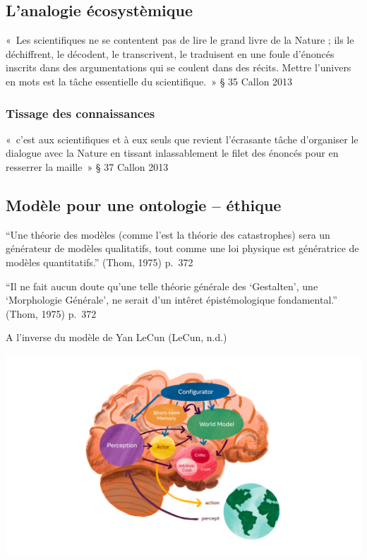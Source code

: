 \documentclass[
  letterpaper,
  DIV=11,
  numbers=noendperiod]{scrreprt}
\begin{document}
\hypertarget{sec-analogieEcosysteme}{%
\subsection{L'analogie écosystèmique}\label{sec-analogieEcosysteme}}

«~Les scientifiques ne se contentent pas de lire le grand livre de la
Nature ; ils le déchiffrent, le décodent, le transcrivent, le traduisent
en une foule d'énoncés inscrits dans des argumentations qui se coulent
dans des récits. Mettre l'univers en mots est la tâche essentielle du
scientifique.~» § 35 Callon 2013

\hypertarget{tissage-des-connaissances}{%
\subsubsection{Tissage des
connaissances}\label{tissage-des-connaissances}}

«~c'est aux scientifiques et à eux seuls que revient l'écrasante tâche
d'organiser le dialogue avec la Nature en tissant inlassablement le
filet des énoncés pour en resserrer la maille~» § 37 Callon 2013

\hypertarget{sec-modeleOntoEthique}{%
\subsection{Modèle pour une ontologie --
éthique}\label{sec-modeleOntoEthique}}

``Une théorie des modèles (comme l'est la théorie des catastrophes) sera
un générateur de modèles qualitatifs, tout comme une loi physique est
génératrice de modèles quantitatifs.'' (Thom, 1975) p.~372

``Il ne fait aucun doute qu'une telle théorie générale des `Gestalten',
une `Morphologie Générale', ne serait d'un intêret épistémologique
fondamental.'' (Thom, 1975) p.~372

A l'inverse du modèle de Yan LeCun (LeCun, n.d.)

\includegraphics{images/LeCunArchitecturePerceptionAction.jpg}
\end{document}
